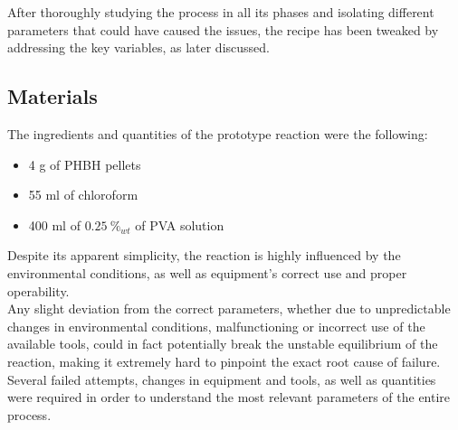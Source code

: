 \documentclass{article}
\begin{document}
%
%

    After thoroughly studying the process in all its phases and isolating different parameters that could have caused the issues, 
    the recipe has been tweaked by addressing the key variables, as later discussed. 

        \subsection{Materials\label{Components}}

        The ingredients and quantities of the prototype reaction were the following: 

            \begin{itemize}
                \item 4 g of PHBH pellets 
                \item 55 ml of chloroform 
                \item 400 ml of $0.25 \ \%_{wt} $ of PVA solution 
            \end{itemize} 
        

        Despite its apparent simplicity, the reaction is highly influenced by the environmental conditions, as well as
        equipment's correct use and proper operability. \\ 
        
        Any slight deviation from the correct parameters, whether due to 
        unpredictable changes in environmental conditions, malfunctioning or incorrect use of the available tools, could 
        in fact potentially break the unstable equilibrium of the reaction, making it extremely 
        hard to pinpoint the exact root cause of failure. \\  

        Several failed attempts, changes in equipment and tools, as well as quantities were required in order 
        to understand the most relevant parameters of the entire process. 
\end{document}
